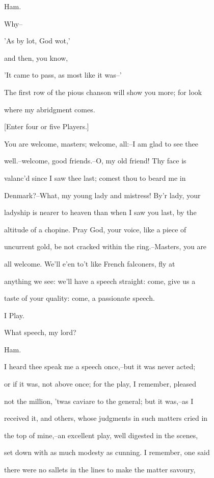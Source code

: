 \documentclass[12pt]{book}
\begin{document}
Ham.

Why--

   'As by lot, God wot,'

and then, you know,

   'It came to pass, as most like it was--'

The first row of the pious chanson will show you more; for look

where my abridgment comes.



[Enter four or five Players.]



You are welcome, masters; welcome, all:--I am glad to see thee

well.--welcome, good friends.--O, my old friend! Thy face is

valanc'd since I saw thee last; comest thou to beard me in

Denmark?--What, my young lady and mistress! By'r lady, your

ladyship is nearer to heaven than when I saw you last, by the

altitude of a chopine. Pray God, your voice, like a piece of

uncurrent gold, be not cracked within the ring.--Masters, you are

all welcome. We'll e'en to't like French falconers, fly at

anything we see: we'll have a speech straight: come, give us a

taste of your quality: come, a passionate speech.



I Play.

What speech, my lord?



Ham.

I heard thee speak me a speech once,--but it was never acted;

or if it was, not above once; for the play, I remember, pleased

not the million, 'twas caviare to the general; but it was,--as I

received it, and others, whose judgments in such matters cried in

the top of mine,--an excellent play, well digested in the scenes,

set down with as much modesty as cunning. I remember, one said

there were no sallets in the lines to make the matter savoury,
\end{document}

